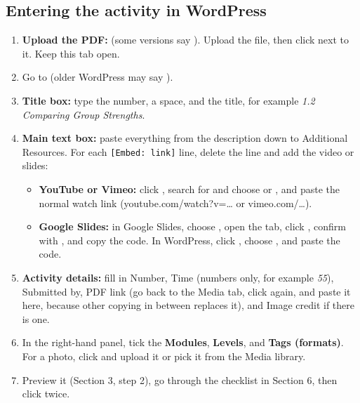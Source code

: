 \subsection*{Entering the activity in WordPress}
\begin{enumerate}
  \item \textbf{Upload the PDF:}  (some versions say ). Upload the file, then click  next to it. Keep this tab open.
  \item Go to  (older WordPress may say ).
  \item \textbf{Title box:} type the number, a space, and the title, for example \textit{1.2 Comparing Group Strengths}.
  \item \textbf{Main text box:} paste everything from the description down to Additional Resources. For each \texttt{[Embed: link]} line, delete the line and add the video or slides:
  \begin{itemize}
    \item \textbf{YouTube or Vimeo:} click \menu{+}, search for and choose  or , and paste the normal watch link (youtube.com/watch?v=\ldots{} or vimeo.com/\ldots).
    \item \textbf{Google Slides:} in Google Slides, choose , open the  tab, click , confirm with , and copy the code. In WordPress, click \menu{+}, choose , and paste the code.
  \end{itemize}
  \item \textbf{Activity details:} fill in Number, Time (numbers only, for example \textit{55}), Submitted by, PDF link (go back to the Media tab, click  again, and paste it here, because other copying in between replaces it), and Image credit if there is one.
  \item In the right-hand panel, tick the \textbf{Modules}, \textbf{Levels}, and \textbf{Tags (formats)}. For a photo, click  and upload it or pick it from the Media library.
  \item Preview it (Section 3, step 2), go through the checklist in Section 6, then click  twice.
\end{enumerate}

